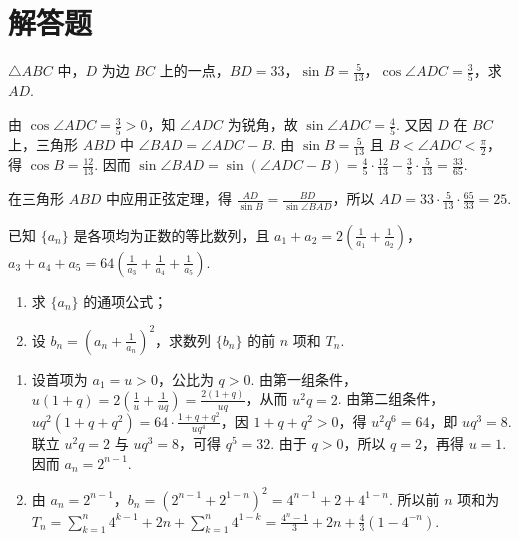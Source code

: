 \section{解答题}

\begin{problem}
\(\triangle ABC\) 中，\(D\) 为边 \(BC\) 上的一点，\(BD = 33\)，\(\sin B = \frac{5}{13}\)，\(\cos \angle ADC = \frac{3}{5}\)，求 \(AD\).
\end{problem}

\begin{solution}
由 \(\cos\angle ADC=\frac{3}{5}>0\)，知 \(\angle ADC\) 为锐角，故 \(\sin\angle ADC=\frac{4}{5}\). 又因 \(D\) 在 \(BC\) 上，三角形 \(ABD\) 中 \(\angle BAD=\angle ADC-B\). 由 \(\sin B=\frac{5}{13}\) 且 \(B<\angle ADC<\frac{\pi}{2}\)，得 \(\cos B=\frac{12}{13}\). 因而 \(\sin\angle BAD=\sin\left(\angle ADC-B\right)=\frac{4}{5}\cdot\frac{12}{13}-\frac{3}{5}\cdot\frac{5}{13}=\frac{33}{65}\).

在三角形 \(ABD\) 中应用正弦定理，得 \(\frac{AD}{\sin B}=\frac{BD}{\sin\angle BAD}\)，所以 \(AD=33\cdot\frac{5}{13}\cdot\frac{65}{33}=25\).
\end{solution}

\begin{problem}
已知 \(\{a_{n}\}\) 是各项均为正数的等比数列，且 \(a_{1} + a_{2} = 2\left(\frac{1}{a_{1}} + \frac{1}{a_{2}}\right)\)，\(a_{3} + a_{4} + a_{5} = 64\left(\frac{1}{a_{3}} + \frac{1}{a_{4}} + \frac{1}{a_{5}}\right)\).

\begin{enumerate}
\item 求 \( \{a_{n}\} \) 的通项公式；
\item 设 \( b_n = \left(a_n + \frac{1}{a_n}\right)^2 \)，求数列 \( \{b_n\} \) 的前 \( n \) 项和 \( T_n \).
\end{enumerate}
\end{problem}

\begin{solution}
\begin{enumerate}
\item 设首项为 \(a_1=u>0\)，公比为 \(q>0\). 由第一组条件，\(u(1+q)=2\left(\frac{1}{u}+\frac{1}{uq}\right)=\frac{2(1+q)}{uq}\)，从而 \(u^2q=2\). 由第二组条件，\(u q^2(1+q+q^2)=64\cdot\frac{1+q+q^2}{u q^4}\)，因 \(1+q+q^2>0\)，得 \(u^2q^6=64\)，即 \(u q^3=8\). 联立 \(u^2q=2\) 与 \(u q^3=8\)，可得 \(q^5=32\). 由于 \(q>0\)，所以 \(q=2\)，再得 \(u=1\). 因而 \(a_n=2^{n-1}\).
\item 由 \(a_n=2^{n-1}\)，\(b_n=\left(2^{n-1}+2^{1-n}\right)^2=4^{n-1}+2+4^{1-n}\). 所以前 \(n\) 项和为 \(T_n=\sum_{k=1}^{n}4^{k-1}+2n+\sum_{k=1}^{n}4^{1-k}=\frac{4^n-1}{3}+2n+\frac{4}{3}\left(1-4^{-n}\right)\).
\end{enumerate}
\end{solution}

